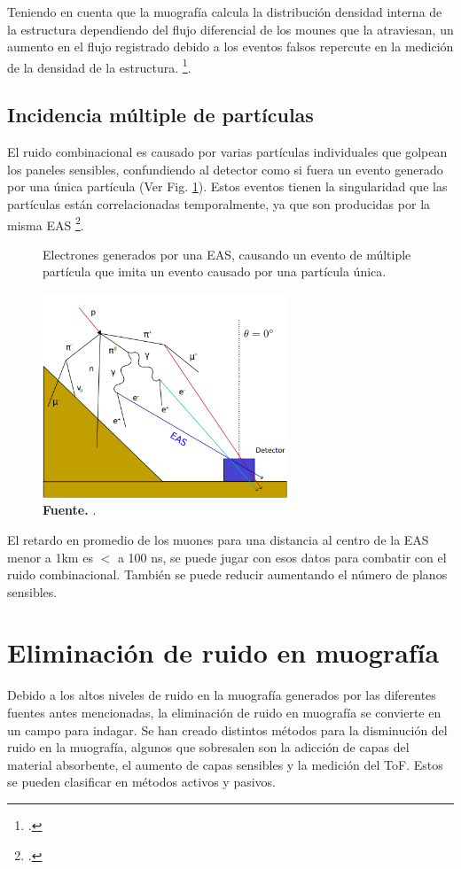 Teniendo en cuenta que la muografía calcula la distribución densidad interna de la estructura dependiendo del flujo diferencial de los mounes que la atraviesan, un aumento en el flujo registrado debido a los eventos falsos repercute en la medición de la densidad de la estructura. \footcite{Nishiyama2014}.  

\subsection{Incidencia múltiple de partículas}
El ruido combinacional es causado por varias partículas individuales que golpean los paneles sensibles, confundiendo al detector como si fuera un evento generado por una única partícula (Ver Fig. \ref{Mult}). Estos eventos tienen la singularidad que las partículas están correlacionadas temporalmente, ya que son producidas por la misma EAS \footcite{jesusP}. 


\begin{figure}[H]
    \begin{center}
        \caption{Electrones  generados por una EAS, causando un evento de múltiple partícula que imita un evento causado por una partícula única.}
        \includegraphics[width=0.65\textwidth]{Figures/imagenes/50.png}
        \caption*{\textbf{Fuente.} \cite{jesusP}. }
        \label{Mult}
    \end{center}
\end{figure}

El retardo en promedio de los muones para una distancia al centro de la EAS menor a 1km es $<$ a 100 ns, se puede jugar con esos datos para combatir con el ruido combinacional. También se puede reducir aumentando el número de planos sensibles.

\section{Eliminación de ruido en muografía}
 Debido a los altos niveles de ruido en la muografía generados por las diferentes fuentes antes mencionadas, la eliminación de ruido en muografía se convierte en un campo para indagar. Se han creado distintos métodos para la disminución del ruido en la muografía, algunos que sobresalen son la adicción de capas del material absorbente, el aumento de capas sensibles y la medición del ToF. Estos se pueden clasificar en métodos activos y pasivos.  

